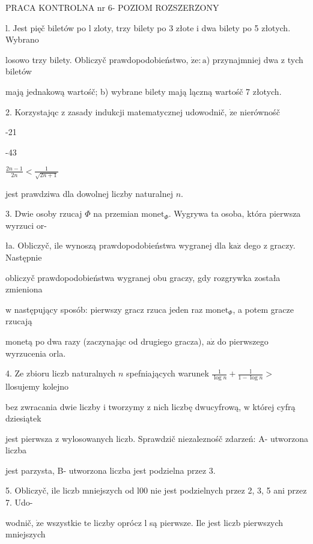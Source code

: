 \documentclass[a4paper,12pt]{article}
\begin{document}
PRACA KONTROLNA nr 6- POZIOM ROZSZERZONY

l. Jest pięč biletów po l zloty, trzy bilety po 3 złote $\mathrm{i}$ dwa bilety po 5 złotych. Wybrano

losowo trzy bilety. Obliczyč prawdopodobieństwo, $\dot{\mathrm{z}}\mathrm{e}:\mathrm{a}$) przynajmniej dwa $\mathrm{z}$ tych biletów

mają jednakową wartośč; b) wybrane bilety mają lączną wartośč 7 złotych.

2. Korzystajqc $\mathrm{z}$ zasady indukcji matematycznej udowodnič, $\dot{\mathrm{z}}\mathrm{e}$ nierównośč

-21

-43

$\displaystyle \frac{2n-1}{2n}<\frac{1}{\sqrt{2n+1}}$

jest prawdziwa dla dowolnej liczby naturalnej $n.$

3. Dwie osoby rzucaj $\Phi$ na przemian $\mathrm{m}\mathrm{o}\mathrm{n}\mathrm{e}\mathrm{t}_{\Phi}$. Wygrywa ta osoba, która pierwsza wyrzuci or-

ła. Obliczyč, ile wynoszą prawdopodobieństwa wygranej dla $\mathrm{k}\mathrm{a}\dot{\mathrm{z}}$ dego $\mathrm{z}$ graczy. Następnie

obliczyč prawdopodobieństwa wygranej obu graczy, gdy rozgrywka została zmieniona

$\mathrm{w}$ następujący sposób: pierwszy gracz rzuca jeden raz $\mathrm{m}\mathrm{o}\mathrm{n}\mathrm{e}\mathrm{t}_{\Phi}$, a potem gracze rzucają

monetą po dwa razy (zaczynając od drugiego gracza), $\mathrm{a}\dot{\mathrm{z}}$ do pierwszego wyrzucenia orla.

4. Ze zbioru liczb naturalnych $n$ spefniających warunek $\displaystyle \frac{1}{\log n}+\frac{\mathrm{l}}{1-\log n}>$ llosujemy kolejno

bez zwracania dwie liczby $\mathrm{i}$ tworzymy $\mathrm{z}$ nich liczbę dwucyfrową, $\mathrm{w}$ której cyfrą dziesiątek

jest pierwsza $\mathrm{z}$ wylosowanych liczb. Sprawdzič niezaleznośč zdarzeń: A- utworzona liczba

jest parzysta, B- utworzona liczba jest podzielna przez 3.

5. Obliczyč, ile liczb mniejszych od l00 nie jest podzielnych przez 2, 3, 5 ani przez 7. Udo-

wodnič, $\dot{\mathrm{z}}\mathrm{e}$ wszystkie te liczby oprócz l są pierwsze. Ile jest liczb pierwszych mniejszych
\end{document}
